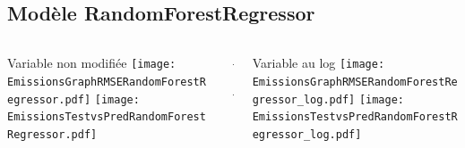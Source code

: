 \documentclass[8pt,aspectratio=169,hyperref={unicode=true}]{beamer}
\begin{document}
\subsection{Modèle RandomForestRegressor}
\begin{frame}{\insertsubsection}
  \begin{columns}[t]
    \begin{column}{.33\textwidth}
      \centering Variable non modifiée
      \texttt{[image: EmissionsGraphRMSERandomForestRegressor.pdf]}
      \texttt{[image: EmissionsTestvsPredRandomForestRegressor.pdf]}
    \end{column}
    \begin{column}{.33\textwidth}
      $\Longleftarrow$
      \scriptsize
      {\centering
        }
      

      \normalsize
      $\Longleftarrow$

      \raggedleft{$\Longrightarrow$}
      \scriptsize
      {\centering
        }
      

      \normalsize
      \raggedleft{$\Longrightarrow$}
    \end{column}
    \begin{column}{.33\textwidth}
      \centering Variable au log
      \texttt{[image: EmissionsGraphRMSERandomForestRegressor\_log.pdf]}
      \texttt{[image: EmissionsTestvsPredRandomForestRegressor\_log.pdf]}
    \end{column}
  \end{columns}
\end{frame}
\end{document}

